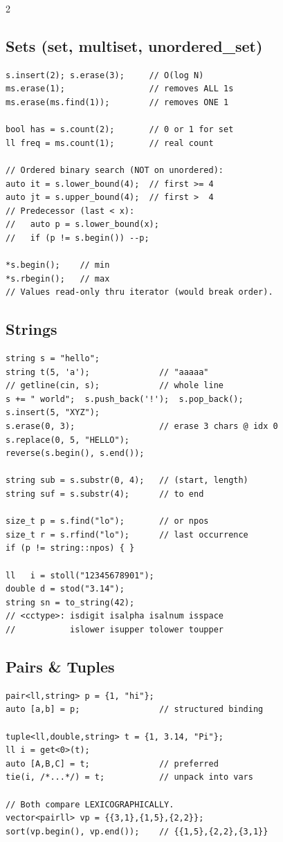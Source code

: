 \documentclass[10pt,letterpaper]{extarticle}
\newenvironment{block}[1]
  {\subsection*{#1}\nopagebreak}
  {\par\addvspace{2pt}}
\begin{document}
\begin{multicols*}{2}
\begin{block}{Sets (set, multiset, unordered\_set)}
\begin{lstlisting}
s.insert(2); s.erase(3);     // O(log N)
ms.erase(1);                 // removes ALL 1s
ms.erase(ms.find(1));        // removes ONE 1

bool has = s.count(2);       // 0 or 1 for set
ll freq = ms.count(1);       // real count

// Ordered binary search (NOT on unordered):
auto it = s.lower_bound(4);  // first >= 4
auto jt = s.upper_bound(4);  // first >  4
// Predecessor (last < x):
//   auto p = s.lower_bound(x);
//   if (p != s.begin()) --p;

*s.begin();    // min
*s.rbegin();   // max
// Values read-only thru iterator (would break order).
\end{lstlisting}
\end{block}

\begin{block}{Strings}
\begin{lstlisting}
string s = "hello";
string t(5, 'a');              // "aaaaa"
// getline(cin, s);            // whole line
s += " world";  s.push_back('!');  s.pop_back();
s.insert(5, "XYZ");
s.erase(0, 3);                 // erase 3 chars @ idx 0
s.replace(0, 5, "HELLO");
reverse(s.begin(), s.end());

string sub = s.substr(0, 4);   // (start, length)
string suf = s.substr(4);      // to end

size_t p = s.find("lo");       // or npos
size_t r = s.rfind("lo");      // last occurrence
if (p != string::npos) { }

ll   i = stoll("12345678901");
double d = stod("3.14");
string sn = to_string(42);
// <cctype>: isdigit isalpha isalnum isspace
//           islower isupper tolower toupper
\end{lstlisting}
\end{block}

\begin{block}{Pairs \& Tuples}
\begin{lstlisting}
pair<ll,string> p = {1, "hi"};
auto [a,b] = p;                // structured binding

tuple<ll,double,string> t = {1, 3.14, "Pi"};
ll i = get<0>(t);
auto [A,B,C] = t;              // preferred
tie(i, /*...*/) = t;           // unpack into vars

// Both compare LEXICOGRAPHICALLY.
vector<pairll> vp = {{3,1},{1,5},{2,2}};
sort(vp.begin(), vp.end());    // {{1,5},{2,2},{3,1}}
\end{lstlisting}
\end{block}


\end{multicols*}
\end{document}

